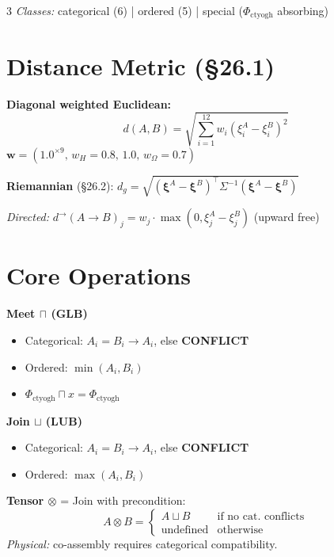 \documentclass[8pt,a4paper,landscape]{article}
\newcommand{\cat}[1]{\textcolor{catblue}{#1}}
\newcommand{\ord}[1]{\textcolor{ordgreen}{#1}}
\newcommand{\spec}[1]{\textcolor{specpurple}{#1}}
\newcommand{\conf}{\textcolor{confred}{\textbf{CONFLICT}}}
\begin{document}
\begin{multicols}{3}
\vspace{0.6em}
\textit{Classes:} \cat{categorical (6)} | \ord{ordered (5)} | \spec{special ($\Phi_{\text{ctyogh}}$ absorbing)}

\section*{Distance Metric (\S26.1)}
\footnotesize
\textbf{Diagonal weighted Euclidean:}
$$d(A,B)=\sqrt{\sum_{i=1}^{12}w_i(\xi_i^A-\xi_i^B)^2}$$
$\mathbf{w}=(1.0^{\times 9},\,w_H{=}0.8,\,1.0,\,w_\Omega{=}0.7)$

\vspace{0.5em}
\textbf{Riemannian} (\S26.2): $d_g=\sqrt{(\boldsymbol{\xi}^A-\boldsymbol{\xi}^B)^\top\Sigma^{-1}(\boldsymbol{\xi}^A-\boldsymbol{\xi}^B)}$

\textit{Directed:} $d^\to(A\to B)_j = w_j\cdot\max(0,\xi_j^A-\xi_j^B)$ (upward free)

\section*{Core Operations}
\footnotesize
\textbf{Meet $\sqcap$ (GLB)}
\begin{itemize}[leftmargin=*,nosep,label={},topsep=4pt,itemsep=2pt]
\item Categorical: $A_i=B_i\to A_i$, else \conf
\item Ordered: $\min(A_i,B_i)$
\item \spec{$\Phi_{\text{ctyogh}}\sqcap x=\Phi_{\text{ctyogh}}$}
\end{itemize}

\textbf{Join $\sqcup$ (LUB)}
\begin{itemize}[leftmargin=*,nosep,label={},topsep=4pt,itemsep=2pt]
\item Categorical: $A_i=B_i\to A_i$, else \conf
\item Ordered: $\max(A_i,B_i)$
\end{itemize}

\textbf{Tensor $\otimes$} = Join with precondition:
$$A\otimes B = \begin{cases} A\sqcup B & \text{if no cat. conflicts} \\ \text{undefined} & \text{otherwise} \end{cases}$$
\textit{Physical:} co-assembly requires categorical compatibility.


\end{multicols}
\end{document}
